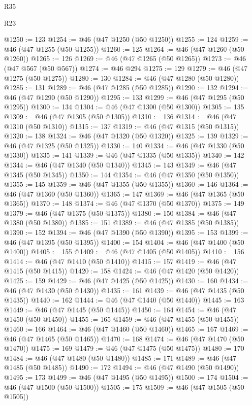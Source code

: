 \begin{lexlean}{R35}
\begin{lexlean}{R23}
\begin{coremodule}
{{{{{{{{{{{{{{{{{{{{{@1250 := 123
@1254 := @46 (@47 @1250 (@50 @1250))
@1255 := 124
@1259 := @46 (@47 @1255 (@50 @1255))
@1260 := 125
@1264 := @46 (@47 @1260 (@50 @1260))
@1265 := 126
@1269 := @46 (@47 @1265 (@50 @1265))
@1273 := @46 (@47 @567 (@50 @567))
@1274 := @46 @294
@1275 := 129
@1279 := @46 (@47 @1275 (@50 @1275))
@1280 := 130
@1284 := @46 (@47 @1280 (@50 @1280))
@1285 := 131
@1289 := @46 (@47 @1285 (@50 @1285))
@1290 := 132
@1294 := @46 (@47 @1290 (@50 @1290))
@1295 := 133
@1299 := @46 (@47 @1295 (@50 @1295))
@1300 := 134
@1304 := @46 (@47 @1300 (@50 @1300))
@1305 := 135
@1309 := @46 (@47 @1305 (@50 @1305))
@1310 := 136
@1314 := @46 (@47 @1310 (@50 @1310))
@1315 := 137
@1319 := @46 (@47 @1315 (@50 @1315))
@1320 := 138
@1324 := @46 (@47 @1320 (@50 @1320))
@1325 := 139
@1329 := @46 (@47 @1325 (@50 @1325))
@1330 := 140
@1334 := @46 (@47 @1330 (@50 @1330))
@1335 := 141
@1339 := @46 (@47 @1335 (@50 @1335))
@1340 := 142
@1344 := @46 (@47 @1340 (@50 @1340))
@1345 := 143
@1349 := @46 (@47 @1345 (@50 @1345))
@1350 := 144
@1354 := @46 (@47 @1350 (@50 @1350))
@1355 := 145
@1359 := @46 (@47 @1355 (@50 @1355))
@1360 := 146
@1364 := @46 (@47 @1360 (@50 @1360))
@1365 := 147
@1369 := @46 (@47 @1365 (@50 @1365))
@1370 := 148
@1374 := @46 (@47 @1370 (@50 @1370))
@1375 := 149
@1379 := @46 (@47 @1375 (@50 @1375))
@1380 := 150
@1384 := @46 (@47 @1380 (@50 @1380))
@1385 := 151
@1389 := @46 (@47 @1385 (@50 @1385))
@1390 := 152
@1394 := @46 (@47 @1390 (@50 @1390))
@1395 := 153
@1399 := @46 (@47 @1395 (@50 @1395))
@1400 := 154
@1404 := @46 (@47 @1400 (@50 @1400))
@1405 := 155
@1409 := @46 (@47 @1405 (@50 @1405))
@1410 := 156
@1414 := @46 (@47 @1410 (@50 @1410))
@1415 := 157
@1419 := @46 (@47 @1415 (@50 @1415))
@1420 := 158
@1424 := @46 (@47 @1420 (@50 @1420))
@1425 := 159
@1429 := @46 (@47 @1425 (@50 @1425))
@1430 := 160
@1434 := @46 (@47 @1430 (@50 @1430))
@1435 := 161
@1439 := @46 (@47 @1435 (@50 @1435))
@1440 := 162
@1444 := @46 (@47 @1440 (@50 @1440))
@1445 := 163
@1449 := @46 (@47 @1445 (@50 @1445))
@1450 := 164
@1454 := @46 (@47 @1450 (@50 @1450))
@1455 := 165
@1459 := @46 (@47 @1455 (@50 @1455))
@1460 := 166
@1464 := @46 (@47 @1460 (@50 @1460))
@1465 := 167
@1469 := @46 (@47 @1465 (@50 @1465))
@1470 := 168
@1474 := @46 (@47 @1470 (@50 @1470))
@1475 := 169
@1479 := @46 (@47 @1475 (@50 @1475))
@1480 := 170
@1484 := @46 (@47 @1480 (@50 @1480))
@1485 := 171
@1489 := @46 (@47 @1485 (@50 @1485))
@1490 := 172
@1494 := @46 (@47 @1490 (@50 @1490))
@1495 := 173
@1499 := @46 (@47 @1495 (@50 @1495))
@1500 := 174
@1504 := @46 (@47 @1500 (@50 @1500))
@1505 := 175
@1509 := @46 (@47 @1505 (@50 @1505))
}}}}}}}}}}}}}}}}}}}}}
\end{coremodule}
\end{lexlean}
\end{lexlean}

